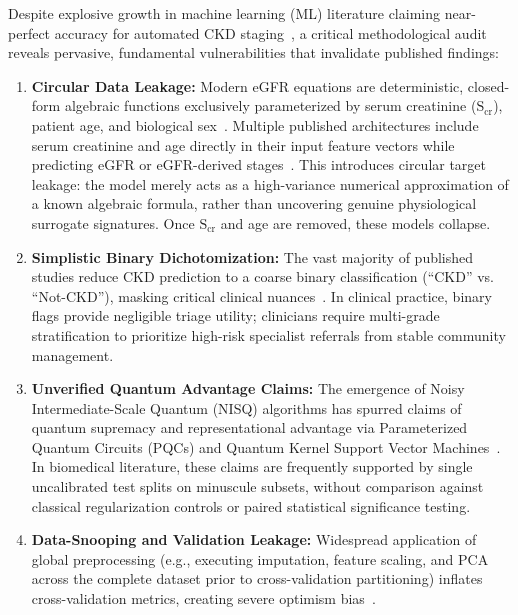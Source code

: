 \documentclass[conference]{IEEEtran}
\begin{document}
Despite explosive growth in machine learning (ML) literature claiming near-perfect accuracy for automated CKD staging~\cite{almansour2019neural, chittora2021efficient}, a critical methodological audit reveals pervasive, fundamental vulnerabilities that invalidate published findings:
\begin{enumerate}
    \item \textbf{Circular Data Leakage:} Modern eGFR equations are deterministic, closed-form algebraic functions exclusively parameterized by serum creatinine ($\text{S}_{\text{cr}}$), patient age, and biological sex~\cite{levey2009new}. Multiple published architectures include serum creatinine and age directly in their input feature vectors while predicting eGFR or eGFR-derived stages~\cite{senan2021machine, debal2022comparative}. This introduces circular target leakage: the model merely acts as a high-variance numerical approximation of a known algebraic formula, rather than uncovering genuine physiological surrogate signatures. Once $\text{S}_{\text{cr}}$ and age are removed, these models collapse.
    \item \textbf{Simplistic Binary Dichotomization:} The vast majority of published studies reduce CKD prediction to a coarse binary classification (``CKD'' vs. ``Not-CKD''), masking critical clinical nuances~\cite{boukenze2016predicting, misir2022performance}. In clinical practice, binary flags provide negligible triage utility; clinicians require multi-grade stratification to prioritize high-risk specialist referrals from stable community management.
    \item \textbf{Unverified Quantum Advantage Claims:} The emergence of Noisy Intermediate-Scale Quantum (NISQ) algorithms has spurred claims of quantum supremacy and representational advantage via Parameterized Quantum Circuits (PQCs) and Quantum Kernel Support Vector Machines~\cite{havlicek2019supervised, schuld2019quantum}. In biomedical literature, these claims are frequently supported by single uncalibrated test splits on minuscule subsets, without comparison against classical regularization controls or paired statistical significance testing.
    \item \textbf{Data-Snooping and Validation Leakage:} Widespread application of global preprocessing (e.g., executing imputation, feature scaling, and PCA across the complete dataset prior to cross-validation partitioning) inflates cross-validation metrics, creating severe optimism bias~\cite{kapoor2023leakage, collins2024tripod}.
\end{enumerate}
\end{document}
